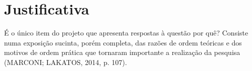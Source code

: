 \chapter{Justificativa}

É o único item do projeto que apresenta respostas à questão por quê?
Consiste numa exposição sucinta, porém completa, das razões de ordem
teóricas e dos motivos de ordem prática que tornaram importante a realização
da pesquisa (MARCONI; LAKATOS, 2014, p. 107).